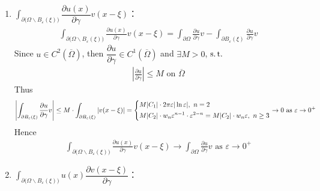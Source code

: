 \begin{enumerate}
		\item \underline{$\int_{\partial \Big( \Omega \backslash B_{\varepsilon}(\xi) \Big)} \dfrac{\partial u(x)}{\partial \gamma} v(x - \xi)$}：
		\begin{align*}
			\int_{\partial \Big( \Omega \backslash B_{\varepsilon}(\xi) \Big)} \frac{\partial u(x)}{\partial \gamma} v(x - \xi) 
			= \int_{\partial \Omega} \frac{\partial u}{\partial \gamma} v - \int_{\partial B_{\varepsilon}(\xi)} \frac{\partial u}{\partial \gamma} v
		\end{align*}
			Since $u \in C^2\left( \overline{\Omega} \right)$, then $\dfrac{\partial u}{\partial \gamma} \in C^1 \left( \overline{\Omega} \right)$ and $\exists M > 0$, $\operatorname{s.t.}$
			\begin{align*}
				\left| \frac{\partial u}{\partial \gamma} \right| \leq M \,\, \text{on} \,\, \overline{\Omega}
			\end{align*}
			Thus
			\begin{align*}
				\left| \int_{\partial B_{\varepsilon}(\xi)} \frac{\partial u}{\partial \gamma} v \right| 
				\leq M \cdot \int_{\partial B_{\varepsilon}(\xi)} \left| v(x - \xi) \right| 
				= \begin{dcases*}
					M | C_1 | \cdot 2 \pi \varepsilon | \ln \varepsilon | , \,\, n = 2 \\
					M | C_2 | \cdot w_n \varepsilon^{n - 1} \cdot \varepsilon^{2 - n} 
					= M | C_2 | \cdot w_n \varepsilon , \,\, n \geq 3
				\end{dcases*} \to 0 \,\, \text{as} \,\, \varepsilon \to 0^+
			\end{align*}
			Hence
			\begin{align*}
				\int_{\partial \Big( \Omega \backslash B_{\varepsilon}(\xi) \Big)} \frac{\partial u(x)}{\partial \gamma} v(x - \xi)  
				\to \int_{\partial \Omega} \frac{\partial u}{\partial \gamma} v 
				\,\, \text{as} \,\, \varepsilon \to 0^+
			\end{align*}
			
			\newpage
			
			\item \underline{$\int_{\partial \Big( \Omega \backslash B_{\varepsilon}(\xi) \Big)} u(x) \dfrac{\partial v(x - \xi)}{\partial \gamma}$}：
			

\end{enumerate}
